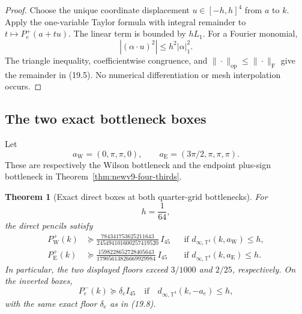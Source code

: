 \documentclass[11pt,oneside]{article}
\newtheorem{theorem}{Theorem}[section]
\theoremstyle{definition}
\theoremstyle{remark}
\begin{document}
\begin{proof}
Choose the unique coordinate displacement \(u\in[-h,h]^4\) from
\(a\) to \(k\).  Apply the one-variable Taylor formula with integral
remainder to \(t\mapsto P_e^+(a+tu)\).  The linear term is bounded by
\(hL_1\).  For a Fourier monomial,
\[
 |(\alpha\cdot u)^2|\le h^2|\alpha|_1^2.
\]
The triangle inequality, coefficientwise congruence, and
\(\|\cdot\|_{\mathrm{op}}\le\|\cdot\|_{\mathrm F}\) give the
remainder in (19.5).  No numerical differentiation or mesh
interpolation occurs.
\end{proof}

\subsection{The two exact bottleneck boxes}

Let
\[
 a_{\mathrm W}=(0,\pi,\pi,0),\qquad
 a_{\mathrm E}=(3\pi/2,\pi,\pi,\pi).                    \tag{19.6}
\]
These are respectively the Wilson bottleneck and the endpoint
plus-sign bottleneck in Theorem~\ref{thm:newv9-four-thirds}.

\begin{theorem}[Exact direct boxes at both quarter-grid bottlenecks]
\label{thm:newv19-direct-boxes}
For
\[
 h=\frac1{64},                                           \tag{19.7}
\]
the direct pencils satisfy
\[
\begin{aligned}
 P_{\mathrm W}^+(k)&\succeq
 \frac{784341753625211643}
 {245494101600257419520}\,I_{45}
 &&\text{if }d_{\infty,\mathbb T^4}(k,a_{\mathrm W})\le h,\\
 P_{\mathrm E}^+(k)&\succeq
 \frac{1598228652728405643}
 {17905613826669929984}\,I_{45}
 &&\text{if }d_{\infty,\mathbb T^4}(k,a_{\mathrm E})\le h.
\end{aligned}                                            \tag{19.8}
\]
In particular, the two displayed floors exceed \(3/1000\) and
\(2/25\), respectively.  On the inverted boxes,
\[
 P_e^-(k)\succeq\delta_e I_{45}
 \quad\text{if}\quad
 d_{\infty,\mathbb T^4}(k,-a_e)\le h,                    \tag{19.9}
\]
with the same exact floor \(\delta_e\) as in (19.8).
\end{theorem}
\end{document}
